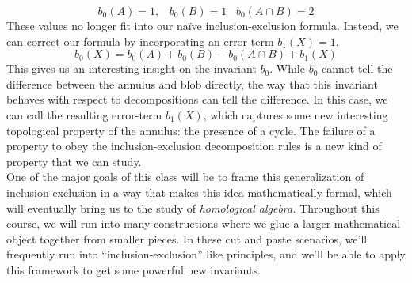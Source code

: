 \begin{doubledtuftepage}
\[ b_0(A)=1,\;\;\; b_0(B)= 1\;\;\; b_0(A\cap B)=2\]
These values no longer fit into our na\"ive inclusion-exclusion formula. Instead, we can correct our formula by incorporating an error term $b_1(X)=1$. 
\[b_0(X)= b_0(A)+b_0(B)-b_0(A\cap B)+b_1(X)\]
This gives us an interesting insight on the invariant $b_0$. While $b_0$ cannot tell the difference between the annulus and blob directly, the way that this invariant behaves with respect to decompositions can tell the difference. In this case, we can call the resulting error-term $b_1(X)$, which captures some new interesting topological property of the annulus: the presence of a cycle. The failure of a property to obey the inclusion-exclusion decomposition rules is a new kind of property that we can study.  \\ One of the major goals of this class will be to frame this generalization of inclusion-exclusion in a way that makes this idea mathematically formal, which will eventually bring us to the study of \emph{homological algebra.} Throughout this course, we will run into many constructions where we glue a larger mathematical object together from smaller pieces. In these cut and paste scenarios, we'll frequently run into  ``inclusion-exclusion'' like principles, and we'll be able to apply this framework to get some powerful new invariants. \;
\end{doubledtuftepage}
